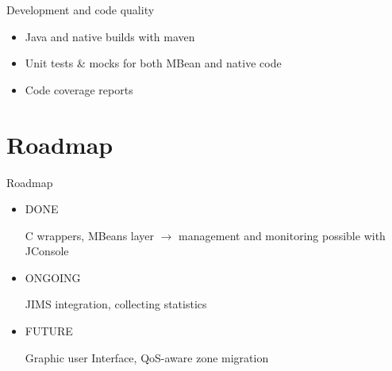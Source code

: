 \documentclass{beamer}
\begin{document}
	\begin{frame}{Development and code quality}

		\begin{itemize}
			\item Java and native builds with maven
			\item Unit tests \& mocks for both MBean and native code
			\item Code coverage reports
		\end{itemize}
	
	\end{frame}


\section{Roadmap}

	\begin{frame}{Roadmap}
		
		\begin{itemize}

			\item DONE
			
				C wrappers, MBeans layer $\rightarrow$ management and monitoring possible with JConsole

			\item ONGOING
			
				JIMS integration, collecting statistics

			\item FUTURE
			
				Graphic user Interface, QoS-aware zone migration

		\end{itemize}

	\end{frame}
\end{document}
